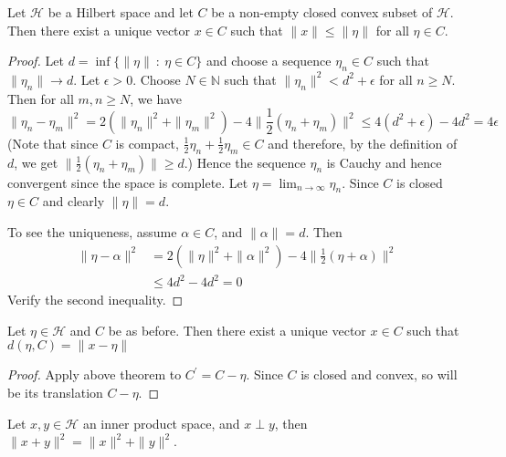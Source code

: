 
\begin{theorem}
  Let $\mathcal{H}$ be a Hilbert space and let $C$ be a non-empty closed convex
  subset of $\mathcal{H}$. Then there exist a unique vector $x \in C$ such that
  $\|x\| \le \|\eta\|$ for all $\eta \in C$.
\end{theorem}
\begin{proof}
  \marginnote{ \scriptsize \textit{\textcolor{red}{construction of the
  proof is a bit tricky}}}
  Let $d = \inf \{ \|\eta\|  \ : \ \eta \in C  \}$ and choose a
  sequence $ \eta_n \in C$  such that $\|\eta_n\| \to d$. Let $
  \epsilon > 0$. Choose $N \in \mathbb{N}$ such that $\|\eta_n\|^2 <
  d^2 + \epsilon$ for all $n \ge N$. Then for all $m,n \ge N$, we have \[
    \|\eta_n - \eta_m\|^2 = 2(\|\eta_n\|^2 + \|\eta_m\|^2) - 4 \|
    \frac{1}{2}(\eta_n + \eta_m) \|^2 \le 4(d^2  + \epsilon) - 4d^2 = 4 \epsilon
  \]
  (Note that since $C$ is compact, $\frac{1}{2}\eta_n +
    \frac{1}{2}\eta_m \in C$ and therefore, by the definition of $d$,
  we get $\|\frac{1}{2}(\eta_n + \eta_m)\| \ge d$.) Hence the sequence
  $\eta_n$ is Cauchy and hence convergent since
  the space is complete. Let $\eta = \lim_{n \to \infty} \eta_n$.
  Since $C$ is closed $\eta \in C$ and clearly $\|\eta\| = d$.

  To see the uniqueness, assume $\alpha \in C$, and $\| \alpha\| = d$. Then
  \begin{align*}
    \|\eta - \alpha\|^2 &= 2(\|\eta\|^2 + \|\alpha\|^2) - 4 \|
    \frac{1}{2}(\eta + \alpha) \|^2 \\
    & \le 4d^2 - 4d^2 = 0
  \end{align*}
  Verify the second inequality.
\end{proof}

\begin{corollary}
  Let $\eta \in \mathcal{H}$ and $C$ be as before. Then there exist a unique
  vector $x \in C$ such that $d(\eta, C) = \|x - \eta\|$
\end{corollary}
\begin{proof}
  Apply above theorem to $C^\prime = C - \eta$. Since $C$ is closed
  and convex, so will be its translation $C - \eta$.
\end{proof}

\begin{proposition}
  \label{PythagorasTheorem}
  Let $ x, y \in \mathcal{H}$ an inner product space, and $x \perp y$, then
  $\|x + y\|^2 = \|x\|^2 + \|y\|^2$.
\end{proposition}

